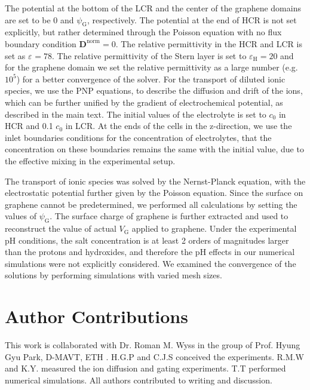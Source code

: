 The potential at the
bottom of the LCR and the center of the graphene domains are set to be
0 and $\psi_{\mathrm{G}}$, respectively. The potential at the end of
HCR is not set explicitly, but rather determined through the Poisson
equation with no flux boundary condition
$\boldsymbol{D}^{\mathrm{norm}}=0$. The relative permittivity in the
HCR and LCR is set as $\varepsilon_{\mathrm{}}=78$. The relative
permittivity of the Stern layer is set to
$\varepsilon_{\mathrm{H}}=20$\autocite{Conway_1951} and for the graphene
domain we set the relative permittivity as a large number
(e.g. $10^{5}$) for a better convergence of the solver.  For the
transport of diluted ionic species, we use the PNP equations, to
describe the diffusion and drift of the ions, which can be further
unified by the gradient of electrochemical potential, as described in
the main text. The initial values of the electrolyte is set to $c_{0}$
in HCR and 0.1 $c_{0}$ in LCR. At the ends of the cells in the
z-direction, we use the inlet boundaries conditions for the
concentration of electrolytes, that the concentration on these
boundaries remains the same with the initial value, due to the
effective mixing in the experimental setup.

The
transport of ionic species was solved by the Nernst-Planck equation,
with the electrostatic potential further given by the Poisson
equation. Since the surface on graphene cannot be predetermined, we
performed all calculations by setting the values of
$\psi_{\mathrm{G}}$. The surface charge of graphene is further
extracted and used to reconstruct the value of actual $V_{\mathrm{G}}$
applied to graphene.  { Under the experimental pH conditions, the salt
  concentration is at least 2 orders of magnitudes larger than the
  protons and hydroxides, and therefore the pH effects in our
  numerical simulations were not explicitly considered.  } We examined
the convergence of the solutions by performing simulations with varied
mesh sizes. 



\section{Author Contributions}
\label{sec:np-np-author-contrib}

This work is collaborated with Dr. Roman M. Wyss in the group of
Prof. Hyung Gyu Park, D-MAVT, ETH \zurich{}.  H.G.P and C.J.S
conceived the experiments. R.M.W and K.Y. measured the ion diffusion
and gating experiments. T.T performed numerical simulations. All
authors contributed to writing and discussion.

























